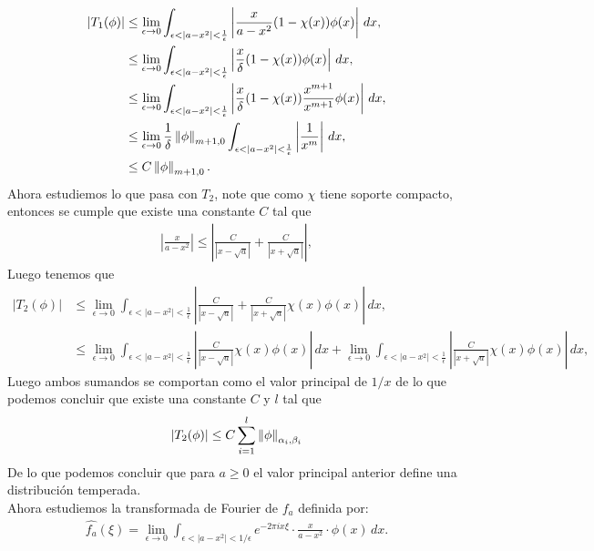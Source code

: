\begin{homeworkProblem}
\begin{solution}
\begin{itemize}
        \begin{align*}
          |T_{1}(\phi)|&\leq \lim_{\epsilon \to 0}\int_{\epsilon<|a-x^2|<\frac{1}{\epsilon}}\left|\frac{x}{a-x^2}(1-\chi(x))\phi(x)\right|\, dx,\\
          &\leq \lim_{\epsilon \to 0} \int_{\epsilon<|a-x^2|<\frac{1}{\epsilon}}\left|\frac{x}{\delta}(1-\chi(x))\phi(x)\right|\, dx,\\
          &\leq \lim_{\epsilon \to 0} \int_{\epsilon<|a-x^2|<\frac{1}{\epsilon}}\left|\frac{x}{\delta}(1-\chi(x))\frac{x^{m+1}}{x^{m+1}}\phi(x)\right|\, dx,\\
          &\leq \lim_{\epsilon \to 0}\frac{1}{\delta}\norm{\phi}_{m+1,0}\int_{\epsilon<|a-x^2|<\frac{1}{\epsilon}}\left|\frac{1}{x^{m}}\right|\, dx,\\
          &\leq C\norm{\phi}_{m+1,0}.
        \end{align*}
        Ahora estudiemos lo que pasa con $T_{2}$, note que como $\chi$ tiene soporte compacto, entonces se cumple que existe una constante $C$ tal que
        \begin{align*}
          \left| \frac{x}{a-x^2} \right|\leq \left| \frac{C}{|x-\sqrt{a}|}+\frac{C}{|x+\sqrt{a}|} \right|,
        \end{align*}
        Luego tenemos que
        \begin{align*}
          |T_{2}(\phi)|&\leq \lim_{\epsilon \to 0}\int_{\epsilon<|a-x^2|<\frac{1}{\epsilon}}\left| \frac{C}{|x-\sqrt{a}|}+\frac{C}{|x+\sqrt{a}|}\chi(x)\phi(x) \right|\, dx,\\
          &\leq \lim_{\epsilon \to 0}\int_{\epsilon<|a-x^2|<\frac{1}{\epsilon}}\left| \frac{C}{|x-\sqrt{a}|}\chi(x)\phi(x) \right|\, dx + \lim_{\epsilon \to 0}\int_{\epsilon<|a-x^2|<\frac{1}{\epsilon}}\left| \frac{C}{|x+\sqrt{a}|}\chi(x)\phi(x) \right|\, dx,
        \end{align*}
        Luego ambos sumandos se comportan como el valor principal de $1/x$ de lo que podemos concluir que existe una constante $C$ y $l$ tal que
        \begin{align*}
          |T_{2}(\phi)|\leq C\sum_{i=1}^{l}\left\|\phi\right\|_{\alpha_{i},\beta_{i}}
        \end{align*}
        De lo que podemos concluir que para $a\geq 0$ el valor principal anterior define una distribución temperada.\\
        Ahora estudiemos la transformada de Fourier de $f_a$ definida por:
        \begin{align*}
          \hat{f_a}(\xi) = \lim_{\epsilon \to 0} \int_{\epsilon < |a - x^2| < 1/\epsilon} e^{-2\pi i x \xi} \cdot \frac{x}{a - x^2} \cdot \phi(x) \, dx.

\end{align*}
\end{itemize}
\end{solution}
\end{homeworkProblem}
